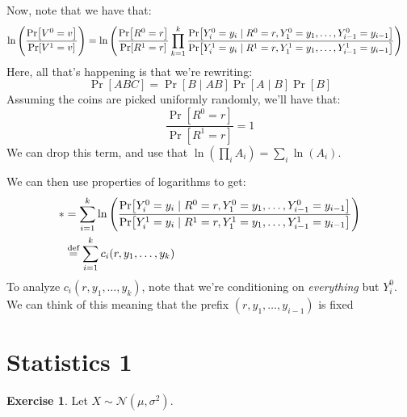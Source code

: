 \documentclass{article}
\theoremstyle{definition}
\newtheorem{exercise}{Exercise}[section]
\begin{document}
Now, note that we have that:
\begin{align*}
\ln\pqty{\frac{\Pr[V^0 = v]}{\Pr[V^1 = v]}} & = \ln\pqty{\frac{\Pr[R^0 = r]}{\Pr[R^1 = r]}\prod_{k = 1}^k\frac{\Pr[Y_i^0 = y_i\mid R^0 = r,Y_1^0 = y_1,\dots,Y_{i-1}^0 = y_{i-1}]}{\Pr[Y_i^1 = y_i\mid R^1 = r,Y_1^1 = y_1,\dots,Y_{i-1}^1 = y_{i-1}]}}
\end{align*}
Here, all that's happening is that we're rewriting:
\begin{equation}
\Pr[ABC] = \Pr[B\mid AB]\Pr[A\mid B]\Pr[B]
\end{equation}
Assuming the coins are picked uniformly randomly, we'll have that:
\begin{equation}
\frac{\Pr[R^0 = r]}{\Pr[R^1 = r]} = 1
\end{equation}
We can drop this term, and use that $\ln(\prod_i A_i) = \sum_i \ln(A_i)$.

We can then use properties of logarithms to get:
\begin{align*}
\ast &= \sum_{i = 1}^k \ln\pqty{\frac{\Pr[Y_i^0 = y_i\mid R^0 = r,Y_1^0 = y_1,\dots,Y_{i-1}^0 = y_{i-1}]}{\Pr[Y_i^1 = y_i\mid R^1 = r,Y_1^1 = y_1,\dots,Y_{i-1}^1 = y_{i-1}]}} \\
&\overset{\text{def}}{=}\sum_{i = 1}^k c_i(r,y_1,\dots,y_k)
\end{align*}
To analyze $c_i(r,y_1,\dots,y_k)$, note that we're conditioning on \emph{everything} but $Y_{i}^0$.
We can think of this meaning that the prefix $(r,y_1,\dots,y_{i-1})$ is fixed
\section{Statistics 1}
\begin{exercise}
Let $X\sim \mathcal{N}(\mu,\sigma^2)$.
\end{exercise}
\end{document}
